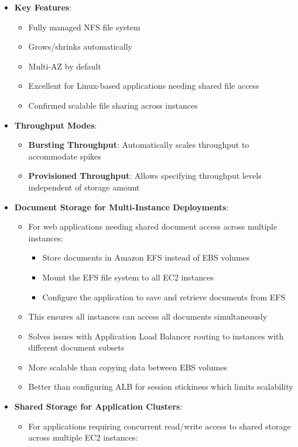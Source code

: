 \documentclass[11pt,a4paper]{report}
\begin{document}
\begin{itemize}
  \item \textbf{Key Features}:
\begin{itemize}
  \item Fully managed NFS file system
  \item Grows/shrinks automatically
  \item Multi-AZ by default
  \item Excellent for Linux-based applications needing shared file access
  \item Confirmed scalable file sharing across instances
\end{itemize}
  \item \textbf{Throughput Modes}:
\begin{itemize}
  \item \textbf{Bursting Throughput}: Automatically scales throughput to accommodate spikes
  \item \textbf{Provisioned Throughput}: Allows specifying throughput levels independent of storage amount
\end{itemize}
  \item \textbf{Document Storage for Multi-Instance Deployments}:
\begin{itemize}
  \item For web applications needing shared document access across multiple instances:
\begin{itemize}
  \item Store documents in Amazon EFS instead of EBS volumes
  \item Mount the EFS file system to all EC2 instances
  \item Configure the application to save and retrieve documents from EFS
\end{itemize}
  \item This ensures all instances can access all documents simultaneously
  \item Solves issues with Application Load Balancer routing to instances with different document subsets
  \item More scalable than copying data between EBS volumes
  \item Better than configuring ALB for session stickiness which limits scalability
\end{itemize}
  \item \textbf{Shared Storage for Application Clusters}:
\begin{itemize}
  \item For applications requiring concurrent read/write access to shared storage across multiple EC2 instances:

\end{itemize}
\end{itemize}
\end{document}
